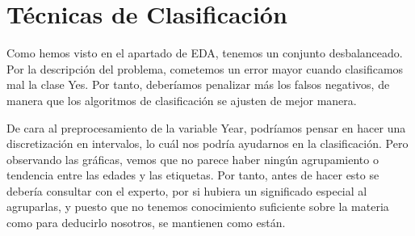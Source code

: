 \section{Técnicas de Clasificación}

Como hemos visto en el apartado de EDA, tenemos un conjunto desbalanceado. Por la descripción del problema, cometemos un error mayor cuando clasificamos mal la clase Yes. Por tanto, deberíamos penalizar más los falsos negativos, de manera que los algoritmos de clasificación se ajusten de mejor manera.

De cara al preprocesamiento de la variable Year, podríamos pensar en hacer una discretización en intervalos, lo cuál nos podría ayudarnos en la clasificación.
Pero observando las gráficas, vemos que no parece haber ningún agrupamiento o tendencia entre las edades y las etiquetas.
Por tanto, antes de hacer esto se debería consultar con el experto, por si hubiera un significado especial al agruparlas, y puesto que no tenemos conocimiento suficiente sobre la materia como para deducirlo nosotros, se mantienen como están.


